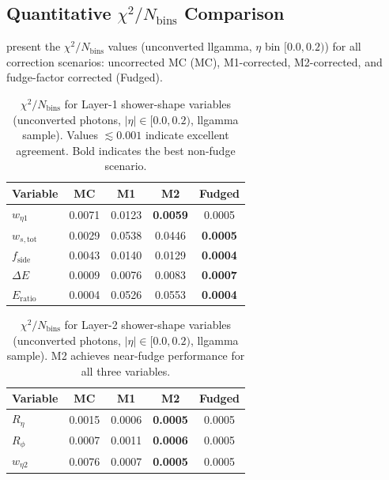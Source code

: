 \documentclass[11pt,a4paper]{article}
\newcommand{\Reta}{R_{\eta}}
\newcommand{\Rphi}{R_{\phi}}
\newcommand{\weta}{w_{\eta 2}}
\newcommand{\wetaone}{w_{\eta 1}}
\newcommand{\wstot}{w_{s,\mathrm{tot}}}
\newcommand{\fside}{f_{\mathrm{side}}}
\newcommand{\dE}{\Delta E}
\newcommand{\Eratio}{E_{\mathrm{ratio}}}
\newcommand{\abseta}{|\eta|}
\newcommand{\chisq}{\chi^2/N_\mathrm{bins}}
\begin{document}
\subsection{Quantitative $\chisq$ Comparison}
\label{sec:layer1:chi2}

 present the $\chisq$ values
(unconverted llgamma, $\eta$ bin $[0.0, 0.2)$) for all correction
scenarios: uncorrected MC (MC), M1-corrected, M2-corrected, and
fudge-factor corrected (Fudged).

\begin{table}[htbp]
  \centering
  \caption{$\chisq$ for Layer-1 shower-shape variables
           (unconverted photons, $\abseta \in [0.0, 0.2)$, llgamma
           sample).  Values $\lesssim 0.001$ indicate excellent
           agreement.  Bold indicates the best non-fudge scenario.}
  \label{tab:chi2_l1}
  \begin{tabular}{lcccc}
    \toprule
    Variable & MC & M1 & M2 & Fudged \\
    \midrule
    $\wetaone$ & 0.0071 & 0.0123 & \textbf{0.0059} & 0.0005 \\
    $\wstot$   & 0.0029 & 0.0538 & 0.0446          & \textbf{0.0005} \\
    $\fside$   & 0.0043 & 0.0140 & 0.0129          & \textbf{0.0004} \\
    $\dE$      & 0.0009 & 0.0076 & 0.0083          & \textbf{0.0007} \\
    $\Eratio$  & 0.0004 & 0.0526 & 0.0553          & \textbf{0.0004} \\
    \bottomrule
  \end{tabular}
\end{table}

\begin{table}[htbp]
  \centering
  \caption{$\chisq$ for Layer-2 shower-shape variables
           (unconverted photons, $\abseta \in [0.0, 0.2)$, llgamma
           sample).  M2 achieves near-fudge performance for all
           three variables.}
  \label{tab:chi2_l2}
  \begin{tabular}{lcccc}
    \toprule
    Variable & MC & M1 & M2 & Fudged \\
    \midrule
    $\Reta$  & 0.0015 & 0.0006 & \textbf{0.0005} & 0.0005 \\
    $\Rphi$  & 0.0007 & 0.0011 & \textbf{0.0006} & 0.0005 \\
    $\weta$  & 0.0076 & 0.0007 & \textbf{0.0005} & 0.0005 \\
    \bottomrule
  \end{tabular}
\end{table}
\end{document}
